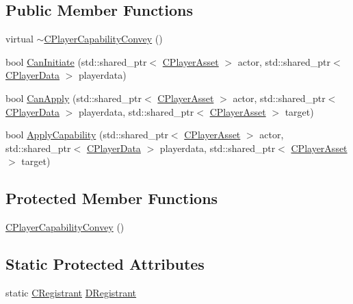 \subsection*{Public Member Functions}
\begin{DoxyCompactItemize}
\item 
virtual \hyperlink{classCPlayerCapabilityConvey_a687e07da4e0f552bd0629183c407229f}{$\sim$\+C\+Player\+Capability\+Convey} ()
\item 
bool \hyperlink{classCPlayerCapabilityConvey_a6c5ebd62a9c3a619c56e070aca5443a7}{Can\+Initiate} (std\+::shared\+\_\+ptr$<$ \hyperlink{classCPlayerAsset}{C\+Player\+Asset} $>$ actor, std\+::shared\+\_\+ptr$<$ \hyperlink{classCPlayerData}{C\+Player\+Data} $>$ playerdata)
\item 
bool \hyperlink{classCPlayerCapabilityConvey_a795b3eb4c3879a6d7da1cba7962a1c78}{Can\+Apply} (std\+::shared\+\_\+ptr$<$ \hyperlink{classCPlayerAsset}{C\+Player\+Asset} $>$ actor, std\+::shared\+\_\+ptr$<$ \hyperlink{classCPlayerData}{C\+Player\+Data} $>$ playerdata, std\+::shared\+\_\+ptr$<$ \hyperlink{classCPlayerAsset}{C\+Player\+Asset} $>$ target)
\item 
bool \hyperlink{classCPlayerCapabilityConvey_ad05e5ab950872e685fb9449592f7f5a9}{Apply\+Capability} (std\+::shared\+\_\+ptr$<$ \hyperlink{classCPlayerAsset}{C\+Player\+Asset} $>$ actor, std\+::shared\+\_\+ptr$<$ \hyperlink{classCPlayerData}{C\+Player\+Data} $>$ playerdata, std\+::shared\+\_\+ptr$<$ \hyperlink{classCPlayerAsset}{C\+Player\+Asset} $>$ target)
\end{DoxyCompactItemize}
\subsection*{Protected Member Functions}
\begin{DoxyCompactItemize}
\item 
\hyperlink{classCPlayerCapabilityConvey_a49f00731755778e903503796adbbe451}{C\+Player\+Capability\+Convey} ()
\end{DoxyCompactItemize}
\subsection*{Static Protected Attributes}
\begin{DoxyCompactItemize}
\item 
static \hyperlink{classCPlayerCapabilityConvey_1_1CRegistrant}{C\+Registrant} \hyperlink{classCPlayerCapabilityConvey_ad04d0065f16c9cbef01832f5a071246d}{D\+Registrant}
\end{DoxyCompactItemize}
